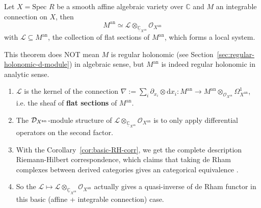 \begin{theorem}\label{thm:basic-RH-corr}
    Let $X = \text{Spec } R$ be a smooth affine algebraic variety over $\mathbb{C}$ and $M$ an integrable connection on $X$,
    then $$M^{\mathrm{an}} \simeq \mathcal{L} \otimes_{\underline{\mathbb{C}}_{X^{\mathrm{an}}}} \mathcal{O}_{X^{\mathrm{an}}}$$
    with $\mathcal{L} \subseteq M^{\mathrm{an}}$, the collection of flat sections of $M^{\mathrm{an}}$, which forms a local system.
\end{theorem}
\begin{remark}
    This theorem does NOT mean $M$ is regular holonomic (see Section~\ref{sec:regular-holonomic-d-module}) in algebraic sense, but $M^{\mathrm{an}}$ is indeed regular holonomic in analytic sense.
\end{remark}
\begin{remark}\label{rmk:basic-RH-corr}
    \mbox{}
    \begin{enumerate}
        \item $\mathcal{L}$ is the kernel of the connection $\nabla := \sum_{i} \partial_{x_i}\otimes \mathrm{d}x_i : M^{\mathrm{an}} \to M^{\mathrm{an}} \otimes_{\mathcal{O}_{X^{\mathrm{an}}}} \Omega_{X^{\mathrm{an}}}^1$, i.e. the sheaf of \textbf{flat sections} of $M^{\mathrm{an}}$.
        \item The $\mathcal{D}_{X^{\mathrm{an}}}$-module structure of $\mathcal{L} \otimes_{\underline{\mathbb{C}}_{X^{\mathrm{an}}}} \mathcal{O}_{X^{\mathrm{an}}}$ is to only apply differential operators on the second factor.
        \item With the Corollary~\ref{cor:basic-RH-corr}, we get the complete description Riemann-Hilbert correspondence, which claims that taking de Rham complexes between derived categories gives an categorical equivalence \cite[Thm.~7.2.1]{hotta2008d}.
        \item So the $\mathcal{L} \mapsto \mathcal{L} \otimes_{\underline{\mathbb{C}}_{X^{\mathrm{an}}}} \mathcal{O}_{X^{\mathrm{an}}}$ actually gives a quasi-inverse of de Rham functor in this basic (affine + integrable connection) case.
    \end{enumerate}
\end{remark}
